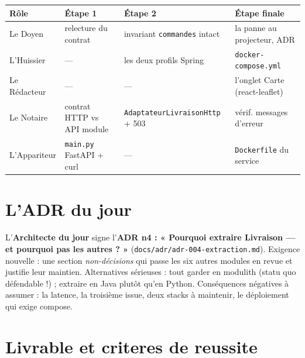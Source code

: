 \documentclass[a4paper,11pt]{article}
\begin{document}
\begin{center}
\small
\begin{tabular}{p{}p{}p{}p{}}
\toprule
\textbf{Rôle} & \textbf{Étape 1} & \textbf{Étape 2} & \textbf{Étape finale} \\
\midrule
Le Doyen & relecture du contrat & invariant \texttt{commandes} intact & la panne au projecteur, ADR \\
\addlinespace
L'Huissier & --- & les deux profils Spring & \texttt{docker-compose.yml} \\
\addlinespace
Le Rédacteur & --- & --- & l'onglet Carte (react-leaflet) \\
\addlinespace
Le Notaire & contrat HTTP vs API module & \texttt{AdaptateurLivraisonHttp} + 503 & vérif. messages d'erreur \\
\addlinespace
L'Appariteur & \texttt{main.py} FastAPI + curl & --- & \texttt{Dockerfile} du service \\
\bottomrule
\end{tabular}
\end{center}

\section{L'ADR du jour}

L'\textbf{Architecte du jour} signe l'\textbf{ADR n4 : « Pourquoi
extraire Livraison --- et pourquoi pas les autres ? »}
(\texttt{docs/adr/adr-004-extraction.md}). Exigence nouvelle : une section
\emph{non-décisions} qui passe les six autres modules en revue et justifie
leur maintien. Alternatives sérieuses : tout garder en modulith (statu quo
défendable !) ; extraire en Java plutôt qu'en Python. Conséquences
négatives à assumer : la latence, la troisième issue, deux stacks à
maintenir, le déploiement qui exige compose.

\section{Livrable et criteres de reussite}
\end{document}
